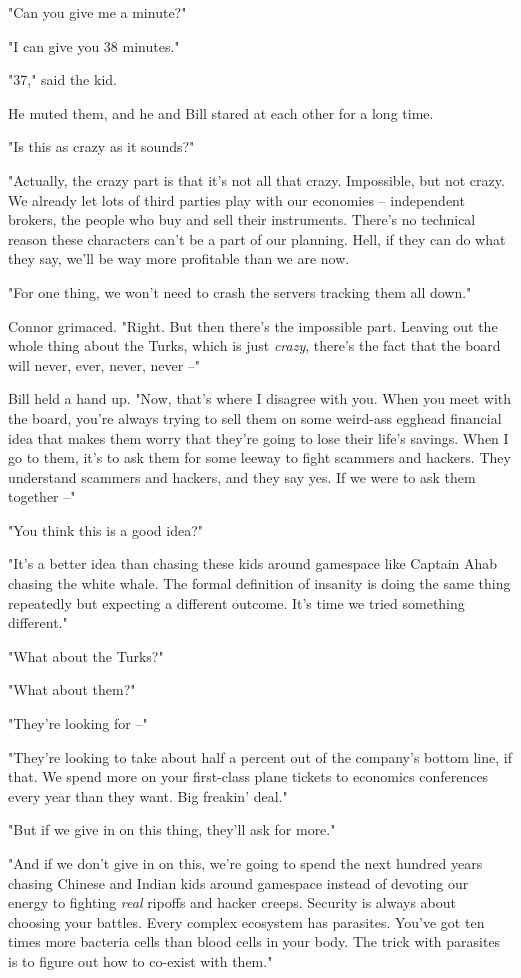 "Can you give me a minute?"

"I can give you 38 minutes."

"37," said the kid.

He muted them, and he and Bill stared at each other for a long
time.

"Is this as crazy as it sounds?"

"Actually, the crazy part is that it's not all that crazy.
Impossible, but not crazy. We already let lots of third parties
play with our economies -- independent brokers, the people who buy
and sell their instruments. There's no technical reason these
characters can't be a part of our planning. Hell, if they can do
what they say, we'll be way more profitable than we are now.

"For one thing, we won't need to crash the servers tracking them
all down."

Connor grimaced. "Right. But then there's the impossible part.
Leaving out the whole thing about the Turks, which is just
\emph{crazy}, there's the fact that the board will never, ever,
never, never --"

Bill held a hand up. "Now, that's where I disagree with you. When
you meet with the board, you're always trying to sell them on some
weird-ass egghead financial idea that makes them worry that they're
going to lose their life's savings. When I go to them, it's to ask
them for some leeway to fight scammers and hackers. They understand
scammers and hackers, and they say yes. If we were to ask them
together --"

"You think this is a good idea?"

"It's a better idea than chasing these kids around gamespace like
Captain Ahab chasing the white whale. The formal definition of
insanity is doing the same thing repeatedly but expecting a
different outcome. It's time we tried something different."

"What about the Turks?"

"What about them?"

"They're looking for --"

"They're looking to take about half a percent out of the company's
bottom line, if that. We spend more on your first-class plane
tickets to economics conferences every year than they want. Big
freakin' deal."

"But if we give in on this thing, they'll ask for more."

"And if we don't give in on this, we're going to spend the next
hundred years chasing Chinese and Indian kids around gamespace
instead of devoting our energy to fighting \emph{real} ripoffs and
hacker creeps. Security is always about choosing your battles.
Every complex ecosystem has parasites. You've got ten times more
bacteria cells than blood cells in your body. The trick with
parasites is to figure out how to co-exist with them."


